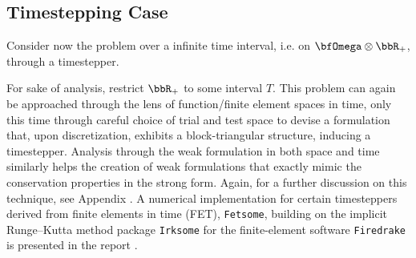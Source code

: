 \subsection*{Timestepping Case}
    
    Consider now the problem over a infinite time interval, i.e. on $\bfOmega\otimes\bbR_{+}$, through a timestepper.
    
     For sake of analysis, restrict $\bbR_{+}$ to some interval $T$. This problem can again be approached through the lens of function/finite element spaces in time, only this time through careful choice of trial and test space to devise a formulation that, upon discretization, exhibits a block-triangular structure, inducing a timestepper. Analysis through the weak formulation in both space and time similarly helps the creation of weak formulations that exactly mimic the conservation properties in the strong form. Again, for a further discussion on this technique, see Appendix . A numerical implementation for certain timesteppers derived from finite elements in time (FET), {\tt Fetsome}, building on the implicit Runge–Kutta method package {\tt Irksome} for the finite-element software {\tt Firedrake} is presented in the report \cite{La22}.